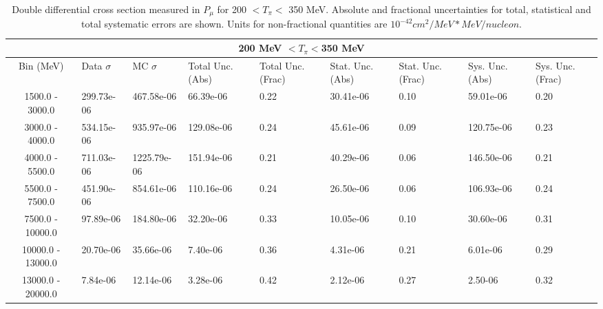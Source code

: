\begin{table}[!htb]
    \centering
    \tiny
    \begin{tabular}{|c|p{0.5in}|p{0.5in}|p{0.5in}|p{0.5in}|p{0.5in}|p{0.5in}|p{0.5in}|p{0.5in}|}

        \hline
        \multicolumn{9}{c}{200 MeV $ < T_\pi < $350 MeV}\\
        \hline
        Bin (MeV)& Data $\sigma$ & MC $\sigma$ & Total Unc. (Abs) & Total Unc. (Frac)  & Stat. Unc. (Abs) & Stat. Unc. (Frac) & Sys. Unc. (Abs) & Sys. Unc. (Frac)\\ \hline
1500.0 - 3000.0 & 299.73e-06 & 467.58e-06 & 66.39e-06 & 0.22 & 30.41e-06 & 0.10 & 59.01e-06 & 0.20\\ \hline
3000.0 - 4000.0 & 534.15e-06 & 935.97e-06 & 129.08e-06 & 0.24 & 45.61e-06 & 0.09 & 120.75e-06 & 0.23\\ \hline
4000.0 - 5500.0 & 711.03e-06 & 1225.79e-06 & 151.94e-06 & 0.21 & 40.29e-06 & 0.06 & 146.50e-06 & 0.21\\ \hline
5500.0 - 7500.0 & 451.90e-06 & 854.61e-06 & 110.16e-06 & 0.24 & 26.50e-06 & 0.06 & 106.93e-06 & 0.24\\ \hline
7500.0 - 10000.0 & 97.89e-06 & 184.80e-06 & 32.20e-06 & 0.33 & 10.05e-06 & 0.10 & 30.60e-06 & 0.31\\ \hline
10000.0 - 13000.0 & 20.70e-06 & 35.66e-06 & 7.40e-06 & 0.36 & 4.31e-06 & 0.21 & 6.01e-06 & 0.29\\ \hline
13000.0 - 20000.0 & 7.84e-06 & 12.14e-06 & 3.28e-06 & 0.42 & 2.12e-06 & 0.27 & 2.50-06 & 0.32\\ \hline

    \end{tabular}
    \caption{Double differential cross section measured in $P_\mu$ for 200 $ < T_\pi < $ 350 MeV. Absolute and fractional uncertainties for total, statistical and total systematic errors are shown. Units for non-fractional quantities are $10^{-42}cm^2/MeV*MeV/nucleon$.}
    \label{tab:ApdxA:XSecTable2Dpmutpi5}
\end{table}



